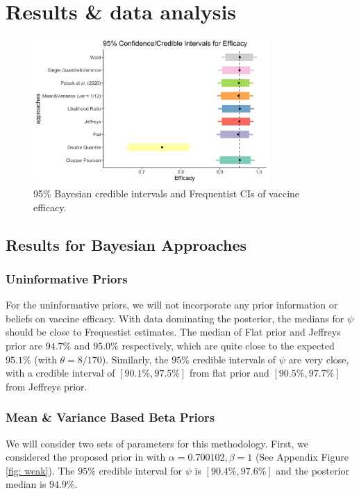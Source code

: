 \documentclass[12pt]{amsart}
\begin{document}
\section{Results \& data analysis}
\begin{figure}[H]
    \centering
    \includegraphics[width = 0.8\textwidth]{intervals.jpeg}
    \caption{\footnotesize{95\% Bayesian credible intervals and Frequentist CIs of vaccine efficacy.}}
    \label{fig: intervals}
\end{figure}
\subsection{Results for Bayesian Approaches}

\subsubsection{Uninformative Priors}
For the uninformative priors, we will not incorporate any prior information or beliefs on vaccine efficacy. With data dominating the posterior, the medians for $\psi$ should be close to Frequestist estimates. The median of Flat prior and Jeffreys prior are $94.7\%$ and $95.0\%$ respectively, which are quite close to the expected $95.1\%$ (with $\theta = 8/170$). Similarly,
the $95\%$ credible intervals of $\psi$ are very close, with a credible interval of $[90.1\%, 97.5\%]$ from flat prior and $[90.5\%, 97.7\%]$ from Jeffreys prior.

\subsubsection{Mean \& Variance Based Beta Priors}
We will consider two sets of parameters for this methodology.
First, we considered the proposed prior in \cite{paper} with $\alpha = 0.700102, \beta = 1$ (See Appendix Figure \ref{fig: weak}). The $95\%$ credible interval for $\psi$ is $[90.4\%, 97.6\%]$ and the posterior median is $94.9\%$.
\end{document}

